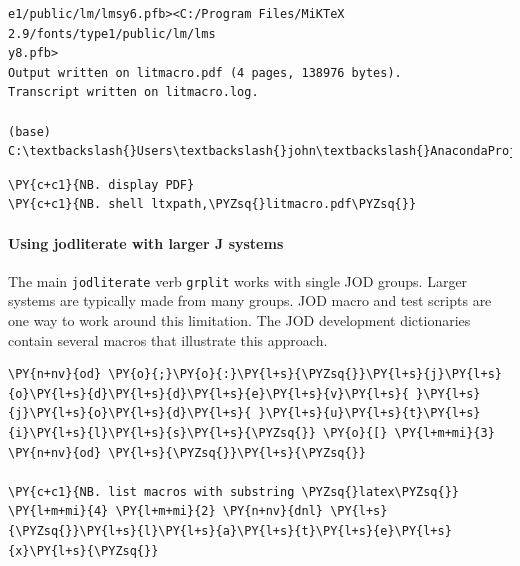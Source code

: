     \begin{Verbatim}[commandchars=\\\{\}]
e1/public/lm/lmsy6.pfb><C:/Program Files/MiKTeX 2.9/fonts/type1/public/lm/lms
y8.pfb>
Output written on litmacro.pdf (4 pages, 138976 bytes).
Transcript written on litmacro.log.

(base) C:\textbackslash{}Users\textbackslash{}john\textbackslash{}AnacondaProjects\textbackslash{}testfolder\textbackslash{}grplit>endlocal

    \end{Verbatim}

    \begin{tcolorbox}[breakable, size=fbox, boxrule=1pt, pad at break*=1mm,colback=cellbackground, colframe=cellborder]
\begin{Verbatim}[commandchars=\\\{\}]
\PY{c+c1}{NB. display PDF}
\PY{c+c1}{NB. shell ltxpath,\PYZsq{}litmacro.pdf\PYZsq{}}
\end{Verbatim}
\end{tcolorbox}

    \hypertarget{using-jodliterate-with-larger-j-systems}{%
\paragraph{Using jodliterate with larger J
systems}\label{using-jodliterate-with-larger-j-systems}}

The main \texttt{jodliterate} verb \texttt{grplit} works with single JOD
groups. Larger systems are typically made from many groups. JOD macro
and test scripts are one way to work around this limitation. The JOD
development dictionaries contain several macros that illustrate this
approach.

    \begin{tcolorbox}[breakable, size=fbox, boxrule=1pt, pad at break*=1mm,colback=cellbackground, colframe=cellborder]
\begin{Verbatim}[commandchars=\\\{\}]
\PY{n+nv}{od} \PY{o}{;}\PY{o}{:}\PY{l+s}{\PYZsq{}}\PY{l+s}{j}\PY{l+s}{o}\PY{l+s}{d}\PY{l+s}{d}\PY{l+s}{e}\PY{l+s}{v}\PY{l+s}{ }\PY{l+s}{j}\PY{l+s}{o}\PY{l+s}{d}\PY{l+s}{ }\PY{l+s}{u}\PY{l+s}{t}\PY{l+s}{i}\PY{l+s}{l}\PY{l+s}{s}\PY{l+s}{\PYZsq{}} \PY{o}{[} \PY{l+m+mi}{3} \PY{n+nv}{od} \PY{l+s}{\PYZsq{}}\PY{l+s}{\PYZsq{}}

\PY{c+c1}{NB. list macros with substring \PYZsq{}latex\PYZsq{}}
\PY{l+m+mi}{4} \PY{l+m+mi}{2} \PY{n+nv}{dnl} \PY{l+s}{\PYZsq{}}\PY{l+s}{l}\PY{l+s}{a}\PY{l+s}{t}\PY{l+s}{e}\PY{l+s}{x}\PY{l+s}{\PYZsq{}}
\end{Verbatim}
\end{tcolorbox}

